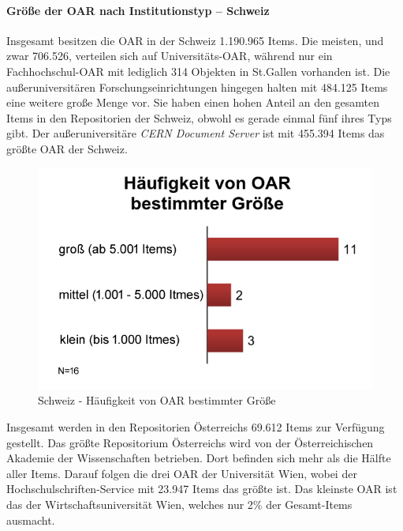 \documentclass[a4paper,
fontsize=11pt,
oneside,
numbers=noperiodatend,
parskip=half-,
bibliography=totoc,
final
]{scrartcl}
\begin{document}
\paragraph{Größe der OAR nach Institutionstyp --
Schweiz}\label{gruxf6uxdfe-der-oar-nach-institutionstyp-schweiz}

Insgesamt besitzen die OAR in der Schweiz 1.190.965 Items. Die meisten,
und zwar 706.526, verteilen sich auf Universitäts-OAR, während nur ein
Fachhochschul-OAR mit lediglich 314 Objekten in St.Gallen vorhanden ist.
Die außeruniversitären Forschungseinrichtungen hingegen halten mit
484.125 Items eine weitere große Menge vor. Sie haben einen hohen Anteil
an den gesamten Items in den Repositorien der Schweiz, obwohl es gerade
einmal fünf ihres Typs gibt. Der außeruniversitäre \emph{CERN Document
Server} ist mit 455.394 Items das größte OAR der Schweiz.

\begin{figure}[htbp]
\centering
\includegraphics{img/abb6_oar_haeufigkeit.jpg}
\caption{Schweiz - Häufigkeit von OAR bestimmter Größe}
\end{figure}

Insgesamt werden in den Repositorien Österreichs 69.612 Items zur
Verfügung gestellt. Das größte Repositorium Österreichs wird von der
Österreichischen Akademie der Wissenschaften betrieben. Dort befinden
sich mehr als die Hälfte aller Items. Darauf folgen die drei OAR der
Universität Wien, wobei der Hochschulschriften-Service mit 23.947 Items
das größte ist. Das kleinste OAR ist das der Wirtschaftsuniversität
Wien, welches nur 2\% der Gesamt-Items ausmacht.
\end{document}
